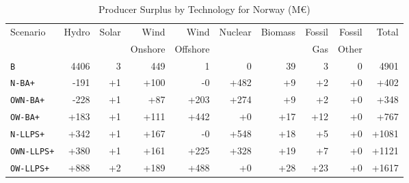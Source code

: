 \begin{table}[htbp]
\centering
\caption{Producer Surplus by Technology for Norway (M€)}
\label{tab:producer_surplus_technology}
\begin{tabular}{lrrrrrrrrr}
\toprule
Scenario & Hydro & Solar & Wind & Wind & Nuclear & Biomass & Fossil & Fossil & Total \\
         &       &       & Onshore & Offshore &  &  & Gas & Other &  \\
\midrule
\texttt{B} & 4406 & 3 & 449 & 1 & 0 & 39 & 3 & 0 & 4901 \\
\midrule
\texttt{N-BA+} & -191 & +1 & +100 & -0 & +482 & +9 & +2 & +0 & +402 \\
\texttt{OWN-BA+} & -228 & +1 & +87 & +203 & +274 & +9 & +2 & +0 & +348 \\
\texttt{OW-BA+} & +183 & +1 & +111 & +442 & +0 & +17 & +12 & +0 & +767 \\
\midrule
\texttt{N-LLPS+} & +342 & +1 & +167 & -0 & +548 & +18 & +5 & +0 & +1081 \\
\texttt{OWN-LLPS+} & +380 & +1 & +161 & +225 & +328 & +19 & +7 & +0 & +1121 \\
\texttt{OW-LLPS+} & +888 & +2 & +189 & +488 & +0 & +28 & +23 & +0 & +1617 \\
\bottomrule
\end{tabular}
\end{table}
